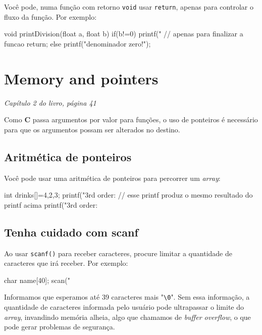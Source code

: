\documentclass[12pt, a4paper]{article}
\begin{document}
Você pode, numa função com retorno \verb|void| usar \verb|return|, apenas para controlar o fluxo da função. Por exemplo:\\

\begin{ccode}
void printDivision(float a, float b){
    if(b!=0){
        printf("%
        // apenas para finalizar a funcao
        return;
    }
    else{
        printf("denominador zero!\n");
    }
}
\end{ccode}

\section{Memory and pointers}
\begin{flushright}
\textit{Capítulo 2 do livro, página 41}
\end{flushright}

Como \textbf{C} passa argumentos por valor para funções, o uso de ponteiros é necessário para que os argumentos possam ser alterados no destino.

\subsection{Aritmética de ponteiros}

Você pode usar uma aritmética de ponteiros para percorrer um \textit{array}:\\

\begin{ccode}
int drinks[]={4,2,3};
printf("3rd order: %
// esse printf produz o mesmo resultado do printf acima
printf("3rd order: %
\end{ccode}

\subsection{Tenha cuidado com scanf}

Ao usar \verb|scanf()| para receber caracteres, procure limitar a quantidade de caracteres que irá receber. Por exemplo:\\

\begin{ccode}
char name[40];
scan("%
\end{ccode}

Informamos que esperamos até 39 caracteres mais "\verb|\0|". Sem essa informação, a quantidade de caracteres informada pelo usuário pode ultrapassar o limite do \textit{array}, invandindo memória alheia, algo que chamamos de \textit{buffer overflow}, o que pode gerar problemas de segurança.
\end{document}
